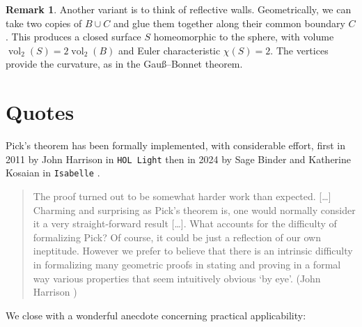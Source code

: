 \documentclass[a4paper]{amsart}
\numberwithin{equation}{section}
\theoremstyle{plain}
\theoremstyle{definition}
\newtheorem{remark}[theorem]{Remark}
\DeclareMathOperator{\vol}{vol}
\begin{document}
\begin{remark}
  Another variant is to think of reflective walls.
  Geometrically, we can take two copies of $B \cup C$
  and glue them together along their common boundary $C$.
  This produces a closed surface $S$ homeomorphic to the sphere,
  with volume $\vol_2(S) = 2 \vol_2(B)$ and Euler characteristic $\chi(S) = 2$.
  The vertices provide the curvature, as in the Gauß--Bonnet theorem.
\end{remark}





\setcounter{section}{16}
\section{Quotes}

Pick's theorem has been formally implemented, with considerable effort,
first in 2011 by John Harrison in \texttt{HOL Light} \cite{Harrison:2011}
then in 2024 by Sage Binder and Katherine Kosaian in \texttt{Isabelle} \cite{Binder:Kosaian:2024}.

\begin{quote}
  The proof turned out to be somewhat harder work than expected. [\dots]
  Charming and surprising as Pick's theorem is, one would normally consider it
  a very straight-forward result [\dots].
  What accounts for the difficulty of formalizing Pick?
  Of course, it could be just a reflection of our own ineptitude.
  However we prefer to believe that there is an intrinsic difficulty
  in formalizing many geometric proofs in stating and proving
  in a formal way various properties that seem intuitively obvious ‘by eye’.
  (John Harrison \cite{Harrison:2011})
\end{quote}

We close with a wonderful anecdote concerning practical applicability: 
\end{document}
